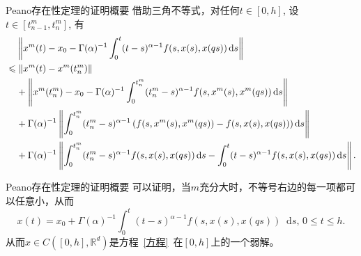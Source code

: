 \documentclass[aspectratio=16 9, 10pt, notheorems]{ctexbeamer}
\let\oldeqref\eqref
\renewcommand{\eqref}[1]{~\oldeqref{#1}~}
\newcommand{\mainEquation}{方程\eqref{方程}}
\newcommand{\differential}{\mathop{}\!\mathrm{d}}
\newcommand{\relphantom}[1]{\mathrel{\phantom{#1}}\negmedspace {}}
\newcommand{\realset}{\mathbb{R}}
\begin{document}
\begin{frame}[allowframebreaks]{Peano存在性定理的证明概要}
    借助三角不等式，对任何$t\in [0,h]$, 设$t\in\left[t^m_{n-1},t^m_n\right]$, 有
    \begin{align*}
        &\relphantom{\leqslant}\left\|x^m(t)-x_0-\Gamma(\alpha)^{-1}\int_{0}^{t}(t-s)^{\alpha-1}f(s,x(s),x(qs))\differential s\right\|
        \\ &\leqslant \left\|x^m(t)-x^m(t^m_n)\right\|
        \\ &\relphantom{\leqslant}+\left\|x^m(t^m_n)-x_0-\Gamma(\alpha)^{-1}\int_{0}^{t^m_n}(t^m_n-s)^{\alpha-1}f(s,x^m(s),x^m(qs))\differential s\right\|
        \\ &\relphantom{\leqslant}+\Gamma(\alpha)^{-1}\left\|\int_{0}^{t^m_n}(t^m_n-s)^{\alpha-1}\left(f(s,x^m(s),x^m(qs))-f(s,x(s),x(qs))\right)\differential s\right\|
        \\ &\relphantom{\leqslant}+\Gamma(\alpha)^{-1}\left\|\int_{0}^{t^m_n}(t^m_n-s)^{\alpha-1}f(s,x(s),x(qs))\differential s-\int_{0}^{t}(t-s)^{\alpha-1}f(s,x(s),x(qs))\differential s\right\|.
    \end{align*}
\end{frame}
\begin{frame}{Peano存在性定理的证明概要}
    可以证明，当$m$充分大时，不等号右边的每一项都可以任意小，从而
    \begin{equation*}
        x(t)=x_0+\Gamma(\alpha)^{-1}\int_{0}^{t}(t-s)^{\alpha-1}f(s,x(s),x(qs))\differential s,\,0\leqslant t\leqslant h.
    \end{equation*}
    从而$x\in C([0,h],\realset^d)$是\mainEquation 在$[0,h]$上的一个弱解。
\end{frame}
\end{document}
